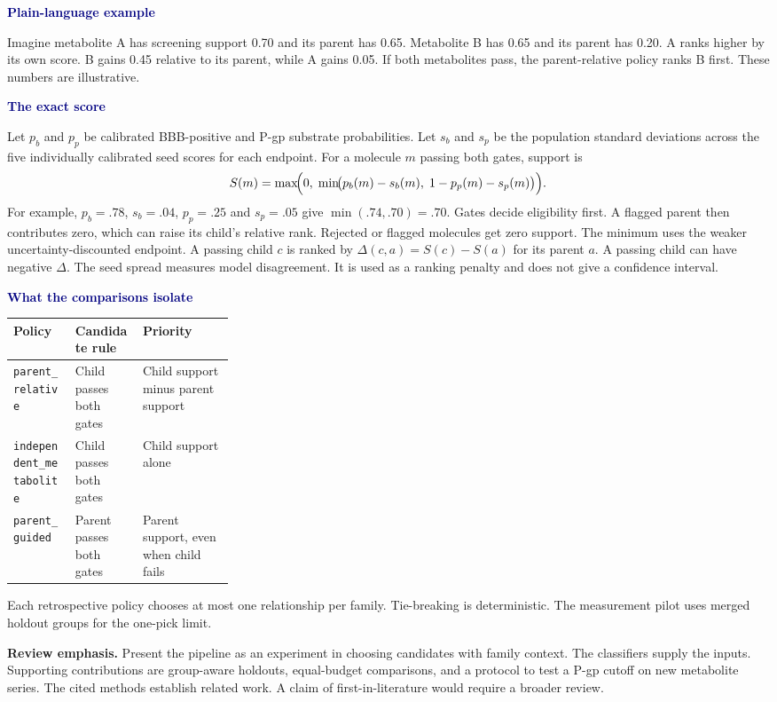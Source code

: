 \documentclass[11pt,a4paper]{article}
\newcommand{\code}[1]{\nolinkurl{#1}}
\newcommand{\lead}[1]{\par\smallskip\textbf{\textcolor{Navy}{#1}}\par\nobreak}
\newcommand{\callout}[1]{\par\smallskip\noindent\colorbox{Pale}{\parbox{\dimexpr\linewidth-2\fboxsep\relax}{\vspace{3pt}#1\vspace{3pt}}}\par\smallskip}
\newcommand{\dense}{\small\renewcommand{\arraystretch}{1.11}\setlength{\tabcolsep}{4pt}}
\begin{document}
\lead{Plain-language example}
Imagine metabolite A has screening support 0.70 and its parent has 0.65. Metabolite B has 0.65 and its parent has 0.20. A ranks higher by its own score. B gains 0.45 relative to its parent, while A gains 0.05. If both metabolites pass, the parent-relative policy ranks B first. These numbers are illustrative.

\lead{The exact score}
Let $p_b$ and $p_p$ be calibrated BBB-positive and P-gp substrate probabilities. Let $s_b$ and $s_p$ be the population standard deviations across the five individually calibrated seed scores for each endpoint. For a molecule $m$ passing both gates, support is
\[
S(m)=\max\!\Bigl(0,\;\min\!\bigl(p_b(m)-s_b(m),\;1-p_p(m)-s_p(m)\bigr)\Bigr).
\]
For example, $p_b=.78$, $s_b=.04$, $p_p=.25$ and $s_p=.05$ give $\min(.74,.70)=.70$. Gates decide eligibility first. A flagged parent then contributes zero, which can raise its child's relative rank. Rejected or flagged molecules get zero support. The minimum uses the weaker uncertainty-discounted endpoint. A passing child $c$ is ranked by $\Delta(c,a)=S(c)-S(a)$ for its parent $a$. A passing child can have negative $\Delta$. The seed spread measures model disagreement. It is used as a ranking penalty and does not give a confidence interval.

\lead{What the comparisons isolate}
{\dense
\begin{tabularx}{\linewidth}{L{0.29\linewidth}YY}
\toprule
Policy & Candidate rule & Priority\\
\midrule
\code{parent_relative} & Child passes both gates & Child support minus parent support\\
\code{independent_metabolite} & Child passes both gates & Child support alone\\
\code{parent_guided} & Parent passes both gates & Parent support, even when child fails\\
\bottomrule
\end{tabularx}}
Each retrospective policy chooses at most one relationship per family. Tie-breaking is deterministic. The measurement pilot uses merged holdout groups for the one-pick limit.

\callout{\textbf{Review emphasis.} Present the pipeline as an experiment in choosing candidates with family context. The classifiers supply the inputs. Supporting contributions are group-aware holdouts, equal-budget comparisons, and a protocol to test a P-gp cutoff on new metabolite series. The cited methods establish related work. A claim of first-in-literature would require a broader review.}
\end{document}

